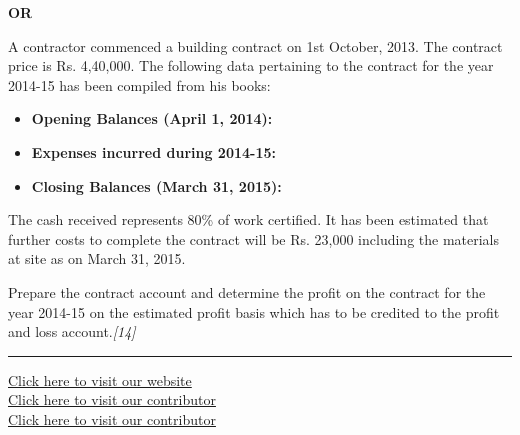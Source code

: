 \documentclass[11pt,a4paper]{article}
\newcommand{\pts}[1]{\hfill   \textit{[#1]}}
\begin{document}
\centerline{   \textbf{OR}}

A contractor commenced a building contract on 1st October, 2013. The contract price is Rs. 4,40,000. The following data pertaining to the contract for the year 2014-15 has been compiled from his books:


\begin{itemize}[itemsep=3pt,topsep=2pt]
  \item   \textbf{Opening Balances (April 1, 2014):}
    
  \item   \textbf{Expenses incurred during 2014-15:}
    
  \item   \textbf{Closing Balances (March 31, 2015):}
    
\end{itemize}

The cash received represents 80\% of work certified. It has been estimated that further costs to complete the contract will be Rs. 23,000 including the materials at site as on March 31, 2015.

Prepare the contract account and determine the profit on the contract for the year 2014-15 on the estimated profit basis which has to be credited to the profit and loss account.\pts{14}

\vfill
\rule{\linewidth}{0.4pt}

\begin{center}\small
\href{https://bhu-exam.vercel.app/}{Click here to visit our website}\\[4pt]
\href{https://me-aryan.vercel.app/}{Click here to visit our contributor}\\[4pt]
\href{https://quashan-me.vercel.app/}{Click here to visit our contributor}
\end{center}
\end{document}
